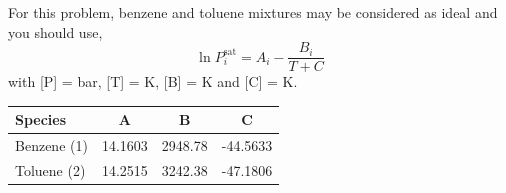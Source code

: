 \documentclass[calculator,steamtables,allquestions,datasheet]{exam_newMarcus2}
\newcommand{\frc}{\displaystyle\frac}
\begin{document}
\begin{question}
\begin{enumerate}[(a)]
{ }

%
\end{enumerate}

For this problem, benzene and toluene mixtures may be considered as ideal and you should use,
\begin{displaymath}
   \ln P_{i}^{\text{sat}} = A_{i} - \frc{B_{i}}{T + C}
\end{displaymath} 
with [P] = bar, [T] = K, [B] = K and [C] = K.
    \begin{center}
       \begin{tabular}{l | c c c}   
           {\bf Species}  &   {\bf A } &  {\bf B } &  {\bf C } \\
           \hline
             Benzene (1)  &  14.1603   &  2948.78  & -44.5633  \\
             Toluene (2)  &  14.2515   &  3242.38  & -47.1806   
       \end{tabular}
    \end{center}
%
\end{question}

\clearpage
\end{document}
